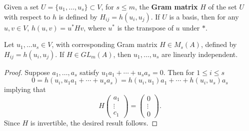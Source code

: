 Given a set $U = \{u_1, \dotsc, u_s\} \subset V$, for $s \le m$, the \textbf{Gram matrix} $H$ of the set $U$ with respect to $h$
is defined by $H_{ij} = h(u_i, u_j)$.
If $U$ is a basis, then for any $u, v \in V$, $h(u,v) = u^*Hv$, where $u^*$ is the transpose of $u$ under $*$.

\begin{lemma}\label{lemma2.4}
Let $u_1, \dotsc u_s \in V$, with corresponding Gram matrix $H \in M_s(A)$, defined by $H_{ij} = h(u_i, u_j)$.
If $H \in GL_m(A)$, then $u_1, \dotsc, u_s$ are linearly independent.
\end{lemma}
\begin{proof}
Suppose $a_1, \dotsc, a_s$ satisfy $u_1 a_1 + \dotsb + u_sa_s = 0$.
Then for $1 \le i \le s$
\[
0 = h(u_i, u_1 a_1 + \dotsb + u_s a_s) = h(u_i, u_1)a_1 + \dotsb + h(u_i, u_s)a_s
\]
implying that 
\[
H \left( \begin{array}{c}
a_1 \\
\vdots \\
c_1
\end{array} \right)
= \left( \begin{array}{c}
0 \\
\vdots \\
0
\end{array}
\right).
\]
Since $H$ is invertible, the desired result follows.
\end{proof}
